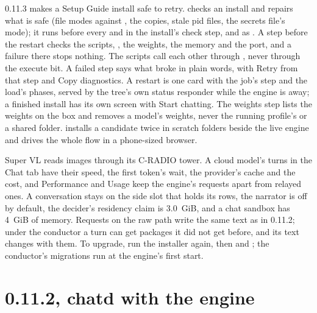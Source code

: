 0.11.3 makes a Setup Guide install safe to retry.  checks an install and repairs what is safe (file modes against , the  copies, stale pid files, the secrets file's mode); it runs before every  and in the install's check step, and as . A step before the restart checks the scripts, , the weights, the memory and the port, and a failure there stops nothing. The scripts call each other through , never through the execute bit. A failed step says what broke in plain words, with Retry from that step and Copy diagnostics. A restart is one card with the job's step and the load's phases, served by the tree's own status responder while the engine is away; a finished install has its own screen with Start chatting. The weights step lists the weights on the box and removes a model's weights, never the running profile's or a shared folder.  installs a candidate twice in scratch folders beside the live engine and drives the whole flow in a phone-sized browser.

Super VL reads images through its C-RADIO tower. A cloud model's turns in the Chat tab have their speed, the first token's wait, the provider's cache and the cost, and Performance and Usage keep the engine's requests apart from relayed ones. A conversation stays on the side slot that holds its rows, the narrator is off by default, the decider's residency claim is 3.0~GiB, and a chat sandbox has 4~GiB of memory. Requests on the raw path write the same text as in 0.11.2; under the conductor a turn can get packages it did not get before, and its text changes with them. To upgrade, run the installer again, then  and ; the conductor's migrations run at the engine's first start.

\section{0.11.2, chatd with the engine}\label{sec:changelog-0112}

